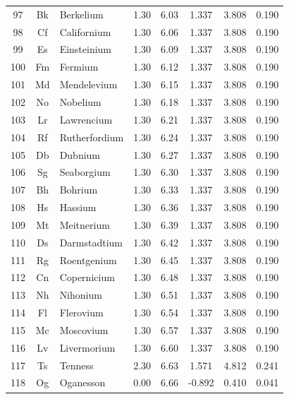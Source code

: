 \documentclass[12pt,a4paper]{article}
\begin{document}
\begin{longtable}{|c|c|p{2.5cm}|c|c|c|c|c|}
		97 & Bk & Berkelium & 1.30 & 6.03 & 1.337 & 3.808 & 0.190 \\
		98 & Cf & Californium & 1.30 & 6.06 & 1.337 & 3.808 & 0.190 \\
		99 & Es & Einsteinium & 1.30 & 6.09 & 1.337 & 3.808 & 0.190 \\
		100 & Fm & Fermium & 1.30 & 6.12 & 1.337 & 3.808 & 0.190 \\
		101 & Md & Mendelevium & 1.30 & 6.15 & 1.337 & 3.808 & 0.190 \\
		102 & No & Nobelium & 1.30 & 6.18 & 1.337 & 3.808 & 0.190 \\
		103 & Lr & Lawrencium & 1.30 & 6.21 & 1.337 & 3.808 & 0.190 \\
		104 & Rf & Rutherfordium & 1.30 & 6.24 & 1.337 & 3.808 & 0.190 \\
		105 & Db & Dubnium & 1.30 & 6.27 & 1.337 & 3.808 & 0.190 \\
		106 & Sg & Seaborgium & 1.30 & 6.30 & 1.337 & 3.808 & 0.190 \\
		107 & Bh & Bohrium & 1.30 & 6.33 & 1.337 & 3.808 & 0.190 \\
		108 & Hs & Hassium & 1.30 & 6.36 & 1.337 & 3.808 & 0.190 \\
		109 & Mt & Meitnerium & 1.30 & 6.39 & 1.337 & 3.808 & 0.190 \\
		110 & Ds & Darmstadtium & 1.30 & 6.42 & 1.337 & 3.808 & 0.190 \\
		111 & Rg & Roentgenium & 1.30 & 6.45 & 1.337 & 3.808 & 0.190 \\
		112 & Cn & Copernicium & 1.30 & 6.48 & 1.337 & 3.808 & 0.190 \\
		113 & Nh & Nihonium & 1.30 & 6.51 & 1.337 & 3.808 & 0.190 \\
		114 & Fl & Flerovium & 1.30 & 6.54 & 1.337 & 3.808 & 0.190 \\
		115 & Mc & Moscovium & 1.30 & 6.57 & 1.337 & 3.808 & 0.190 \\
		116 & Lv & Livermorium & 1.30 & 6.60 & 1.337 & 3.808 & 0.190 \\
		117 & Ts & Tenness & 2.30 & 6.63 & 1.571 & 4.812 & 0.241 \\
		118 & Og & Oganesson & 0.00 & 6.66 & -0.892 & 0.410 & 0.041 \\
		\hline
	\end{longtable}
	
\end{document}
